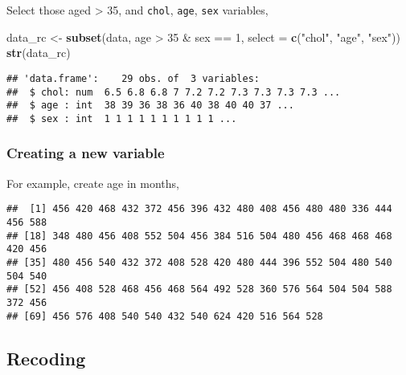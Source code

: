 \documentclass[]{book}
\newenvironment{Shaded}{\begin{snugshade}}{\end{snugshade}}
\newcommand{\KeywordTok}[1]{\textcolor[rgb]{0.13,0.29,0.53}{\textbf{{#1}}}}
\newcommand{\DataTypeTok}[1]{\textcolor[rgb]{0.13,0.29,0.53}{{#1}}}
\newcommand{\DecValTok}[1]{\textcolor[rgb]{0.00,0.00,0.81}{{#1}}}
\newcommand{\StringTok}[1]{\textcolor[rgb]{0.31,0.60,0.02}{{#1}}}
\newcommand{\NormalTok}[1]{{#1}}
\theoremstyle{definition}
\theoremstyle{definition}
\theoremstyle{remark}
\begin{document}
Select those aged \textgreater{} 35, and \texttt{chol}, \texttt{age},
\texttt{sex} variables,

\begin{Shaded}
\begin{Highlighting}[]
\NormalTok{data_rc <-}\StringTok{ }\KeywordTok{subset}\NormalTok{(data, age >}\StringTok{ }\DecValTok{35} \NormalTok{&}\StringTok{ }\NormalTok{sex ==}\StringTok{ }\DecValTok{1}\NormalTok{, }\DataTypeTok{select =} \KeywordTok{c}\NormalTok{(}\StringTok{"chol"}\NormalTok{, }\StringTok{"age"}\NormalTok{, }\StringTok{"sex"}\NormalTok{))}
\KeywordTok{str}\NormalTok{(data_rc)}
\end{Highlighting}
\end{Shaded}

\begin{verbatim}
## 'data.frame':    29 obs. of  3 variables:
##  $ chol: num  6.5 6.8 6.8 7 7.2 7.2 7.3 7.3 7.3 7.3 ...
##  $ age : int  38 39 36 38 36 40 38 40 40 37 ...
##  $ sex : int  1 1 1 1 1 1 1 1 1 1 ...
\end{verbatim}

\subsubsection{Creating a new variable}\label{creating-a-new-variable}

For example, create age in months,

\begin{Shaded}
\end{Shaded}

\begin{verbatim}
##  [1] 456 420 468 432 372 456 396 432 480 408 456 480 480 336 444 456 588
## [18] 348 480 456 408 552 504 456 384 516 504 480 456 468 468 468 420 456
## [35] 480 456 540 432 372 408 528 420 480 444 396 552 504 480 540 504 540
## [52] 456 408 528 468 456 468 564 492 528 360 576 564 504 504 588 372 456
## [69] 456 576 408 540 540 432 540 624 420 516 564 528
\end{verbatim}

\subsection{Recoding}\label{recoding}
\end{document}
